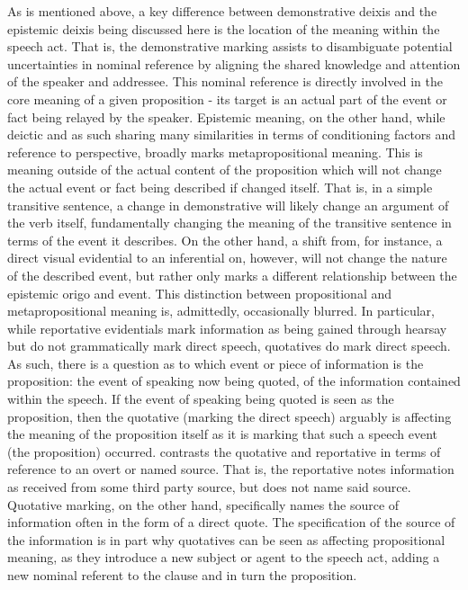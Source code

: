 As is mentioned above, a key difference between demonstrative deixis and the epistemic deixis being discussed here is the location of the meaning within the speech act. That is, the demonstrative marking assists to disambiguate potential uncertainties in nominal reference by aligning the shared knowledge and attention of the speaker and addressee. This nominal reference is directly involved in the core meaning of a given proposition - its target is an actual part of the event or fact being relayed by the speaker. Epistemic meaning, on the other hand, while deictic and as such sharing many similarities in terms of conditioning factors and reference to perspective, broadly marks metapropositional meaning. This is meaning outside of the actual content of the proposition which will not change the actual event or fact being described if changed itself. That is, in a simple transitive sentence, a change in demonstrative will likely change an argument of the verb itself, fundamentally changing the meaning of the transitive sentence in terms of the event it describes. On the other hand, a shift from, for instance, a direct visual evidential to an inferential on, however, will not change the nature of the described event, but rather only marks a different relationship between the epistemic origo and event. This distinction between propositional and metapropositional meaning is, admittedly, occasionally blurred. In particular, while reportative evidentials mark information as being gained through hearsay but do not grammatically mark direct speech, quotatives do mark direct speech. As such, there is a question as to which event or piece of information is the proposition: the event of speaking now being quoted, of the information contained within the speech. If the event of speaking being quoted is seen as the proposition, then the quotative (marking the direct speech) arguably is affecting the meaning of the proposition itself as it is marking that such a speech event (the proposition) occurred.  contrasts the quotative and reportative in terms of reference to an overt or named source. That is, the reportative notes information as received from some third party source, but does not name said source. Quotative marking, on the other hand, specifically names the source of information often in the form of a direct quote. The specification of the source of the information is in part why quotatives can be seen as affecting propositional meaning, as they introduce a new subject or agent to the speech act, adding a new nominal referent to the clause and in turn the proposition. 

